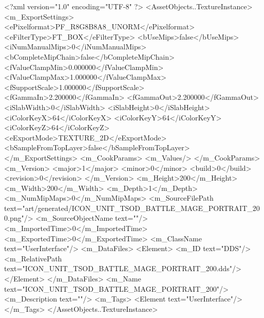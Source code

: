 <?xml version="1.0" encoding="UTF-8" ?>
<AssetObjects..TextureInstance>
	<m_ExportSettings>
		<ePixelformat>PF_R8G8B8A8_UNORM</ePixelformat>
		<eFilterType>FT_BOX</eFilterType>
		<bUseMips>false</bUseMips>
		<iNumManualMips>0</iNumManualMips>
		<bCompleteMipChain>false</bCompleteMipChain>
		<fValueClampMin>0.000000</fValueClampMin>
		<fValueClampMax>1.000000</fValueClampMax>
		<fSupportScale>1.000000</fSupportScale>
		<fGammaIn>2.200000</fGammaIn>
		<fGammaOut>2.200000</fGammaOut>
		<iSlabWidth>0</iSlabWidth>
		<iSlabHeight>0</iSlabHeight>
		<iColorKeyX>64</iColorKeyX>
		<iColorKeyY>64</iColorKeyY>
		<iColorKeyZ>64</iColorKeyZ>
		<eExportMode>TEXTURE_2D</eExportMode>
		<bSampleFromTopLayer>false</bSampleFromTopLayer>
	</m_ExportSettings>
	<m_CookParams>
		<m_Values/>
	</m_CookParams>
	<m_Version>
		<major>1</major>
		<minor>0</minor>
		<build>0</build>
		<revision>0</revision>
	</m_Version>
	<m_Height>200</m_Height>
	<m_Width>200</m_Width>
	<m_Depth>1</m_Depth>
	<m_NumMipMaps>0</m_NumMipMaps>
	<m_SourceFilePath text="art/generated/ICON_UNIT_TSOD_BATTLE_MAGE_PORTRAIT_200.png"/>
	<m_SourceObjectName text=""/>
	<m_ImportedTime>0</m_ImportedTime>
	<m_ExportedTime>0</m_ExportedTime>
	<m_ClassName text="UserInterface"/>
	<m_DataFiles>
		<Element>
			<m_ID text="DDS"/>
			<m_RelativePath text="ICON_UNIT_TSOD_BATTLE_MAGE_PORTRAIT_200.dds"/>
		</Element>
	</m_DataFiles>
	<m_Name text="ICON_UNIT_TSOD_BATTLE_MAGE_PORTRAIT_200"/>
	<m_Description text=""/>
	<m_Tags>
		<Element text="UserInterface"/>
	</m_Tags>
</AssetObjects..TextureInstance>
